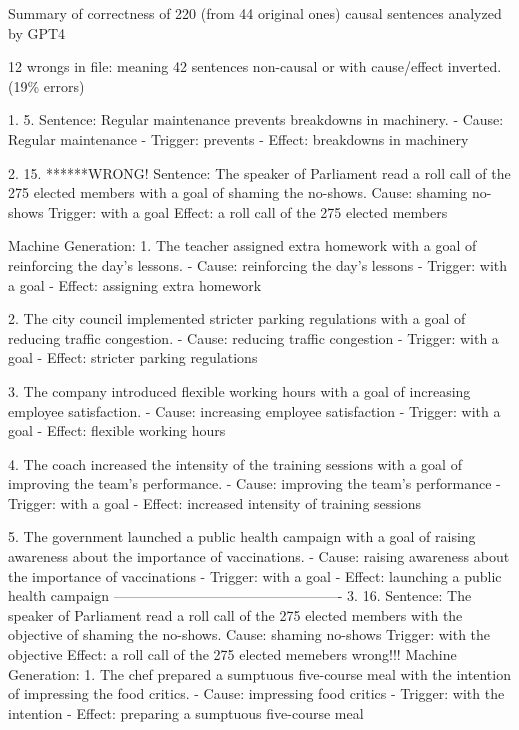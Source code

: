 Summary of correctness of 220 (from 44 original ones) causal sentences analyzed by GPT4

12 wrongs in file: meaning 42 sentences non-causal or with cause/effect inverted. (19\% errors)


1.
5.
Sentence: Regular maintenance prevents breakdowns in machinery.
   - Cause: Regular maintenance
   - Trigger: prevents
   - Effect: breakdowns in machinery
   
   
2.
15. ******WRONG!
Sentence: The speaker of Parliament read a roll call of the 275 elected members with a goal of shaming the no-shows.
Cause: shaming no-shows
Trigger: with a goal
Effect: a roll call of the 275 elected members

Machine Generation: 
1. The teacher assigned extra homework with a goal of reinforcing the day's lessons.
   - Cause: reinforcing the day's lessons
   - Trigger: with a goal
   - Effect: assigning extra homework

2. The city council implemented stricter parking regulations with a goal of reducing traffic congestion.
   - Cause: reducing traffic congestion
   - Trigger: with a goal
   - Effect: stricter parking regulations

3. The company introduced flexible working hours with a goal of increasing employee satisfaction.
   - Cause: increasing employee satisfaction
   - Trigger: with a goal
   - Effect: flexible working hours

4. The coach increased the intensity of the training sessions with a goal of improving the team's performance.
   - Cause: improving the team's performance
   - Trigger: with a goal
   - Effect: increased intensity of training sessions

5. The government launched a public health campaign with a goal of raising awareness about the importance of vaccinations.
   - Cause: raising awareness about the importance of vaccinations
   - Trigger: with a goal
   - Effect: launching a public health campaign
-------------------------------------------------
3.
16.
Sentence: The speaker of Parliament read a roll call of the 275 elected members with the objective of shaming the no-shows.
Cause: shaming no-shows
Trigger: with the objective
Effect: a roll call of the 275 elected memebers
wrong!!!
Machine Generation: 
1. The chef prepared a sumptuous five-course meal with the intention of impressing the food critics.
   - Cause: impressing food critics
   - Trigger: with the intention
   - Effect: preparing a sumptuous five-course meal

